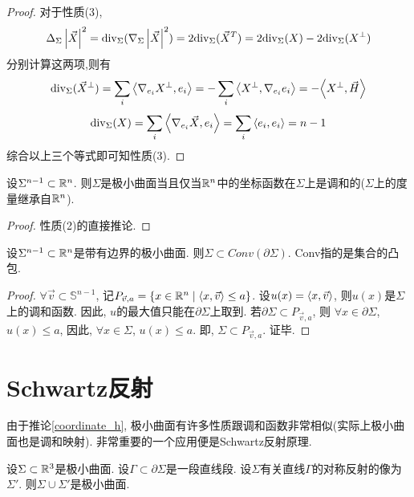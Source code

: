 \begin{proof}
    \par 对于性质(3),
    \begin{equation}
        \Delta_\Sigma\left | {\vec{X}} \right |^2={\text{div}}_\Sigma(\nabla_\Sigma\left | {\vec{X}} \right |^2) = 2{\text{div}}_\Sigma({\vec{X}}^T)=2{\text{div}}_\Sigma(X)-2{\text{div}}_\Sigma(X^\perp)
    \end{equation}
    分别计算这两项,则有
    \begin{equation}
        \div_\Sigma(\XX^\perp)=\sum_i \inner{\nabla_{e_i}X^\perp}{e_i}=-\sum_i\inner{X^\perp}{\nabla_{e_i}e_i}=-\inner{X^\perp}{\vec{H}}%
    \end{equation}
    \begin{equation}
        {\text{div}}_\Sigma(X)=\sum_i {\left < \nabla_{e_i}{\vec{X}}, e_i \right >}=\sum_i{\left < e_i, e_i \right >}=n-1
    \end{equation}
    综合以上三个等式即可知性质(3).
\end{proof}
\begin{corollary} \label{coordinate_h}
    设$\Sigma^{n-1}\subset \mathbb{R}^n$. 则$\Sigma$是极小曲面当且仅当$\mathbb{R}^n$中的坐标函数在$\Sigma$上是调和的($\Sigma$上的度量继承自$\mathbb{R}^n$).
\end{corollary}
\begin{proof}
    性质(2)的直接推论.
\end{proof}
\begin{corollary}
    设$\Sigma^{n-1}\subset \mathbb{R}^n$是带有边界的极小曲面. 则$\Sigma \subset Conv(\partial\Sigma)$. Conv指的是集合的凸包.
\end{corollary}
\begin{proof}
    $\forall \vec{v} \subset \mathbb{S}^{n-1}$, 记$P_{\vec{v},a}=\{x\in \mathbb{R}^n\mid {\left < x, \vec{v} \right >} \le a\}$. 设$u(x)={\left < x, \vec{v} \right >}$, 则$u(x)$是$\Sigma$上的调和函数. 因此, $u$的最大值只能在$\partial \Sigma$上取到. 若$\partial \Sigma \subset P_{\vec{v},a} $, 则 $\forall x \in \partial \Sigma$, $u(x) \le a$, 因此, $\forall x \in \Sigma$, $u(x) \le a$. 即, $\Sigma \subset P_{\vec{v},a}$. 证毕.
\end{proof}
\section{Schwartz反射}
由于推论\eqref{coordinate_h}, 极小曲面有许多性质跟调和函数非常相似(实际上极小曲面也是调和映射). 非常重要的一个应用便是Schwartz反射原理.
\begin{proposition} \label{min_reflection}
    设$\Sigma \subset \mathbb{R}^3$是极小曲面. 设$\Gamma \subset \partial \Sigma$是一段直线段. 设$\Sigma$有关直线$\Gamma$的对称反射的像为$\Sigma'$. 则$\Sigma \cup \Sigma'$是极小曲面.
\end{proposition}
   
